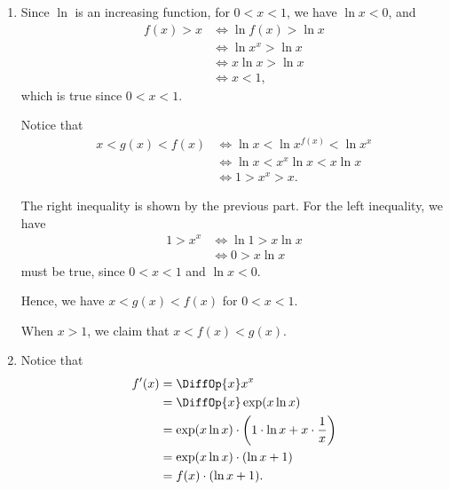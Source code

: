 \Question{\currfilebase}

\begin{enumerate}
    \item Since \(\ln\) is an increasing function, for \(0 < x < 1\), we have \(\ln x < 0\), and
          \begin{align*}
              f(x) > x & \iff \ln f(x) > \ln x \\
                       & \iff \ln x^x > \ln x  \\
                       & \iff x \ln x > \ln x  \\
                       & \iff x < 1,
          \end{align*}
          which is true since \(0 < x < 1\).

          Notice that
          \begin{align*}
              x < g(x) < f(x) & \iff \ln x < \ln x^{f(x)} < \ln x^x \\
                              & \iff \ln x < x^x \ln x < x \ln x    \\
                              & \iff 1 > x^x > x.
          \end{align*}

          The right inequality is shown by the previous part. For the left inequality, we have
          \begin{align*}
              1 > x^x & \iff \ln 1 > x \ln x \\
                      & \iff 0 > x \ln x
          \end{align*}
          must be true, since \(0 < x < 1\) and \(\ln x < 0\).

          Hence, we have \(x < g(x) < f(x)\) for \(0 < x < 1\).

          When \(x > 1\), we claim that \(x < f(x) < g(x)\).

    \item Notice that
          \begin{align*}
              f'(x) & = \DiffOp{x} x^x                                                        \\
                    & = \DiffOp{x} \exp (x \ln x)                                             \\
                    & = \exp (x \ln x) \cdot \left(1 \cdot \ln x + x \cdot \frac{1}{x}\right) \\
                    & = \exp (x \ln x) \cdot (\ln x + 1)                                      \\
                    & = f(x) \cdot (\ln x + 1).
          \end{align*}


\end{enumerate}
